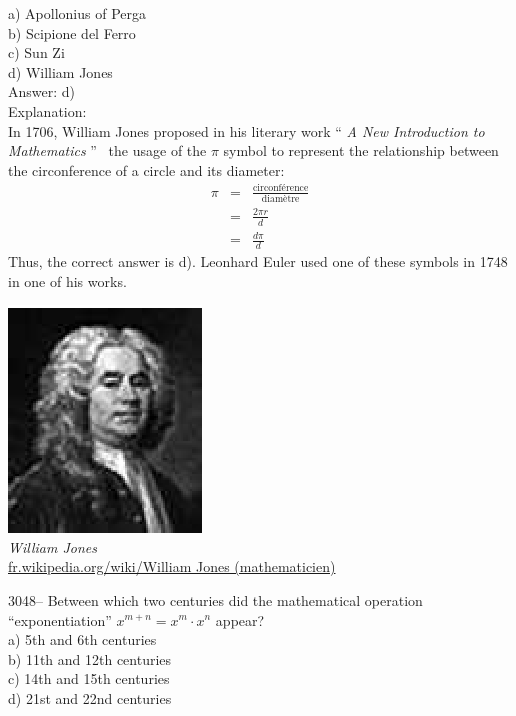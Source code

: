 \documentclass[letterpaper, 12pt]{article}
\begin{document}
a) Apollonius of Perga\\
b) Scipione del Ferro\\
c) Sun Zi\\
d) William Jones\\

Answer: d)\\

Explanation:\\
In 1706, William Jones proposed in his literary work `` \emph{A New Introduction to Mathematics} '' \ the usage of the $\pi$ symbol to represent the relationship between the circonference of a circle and its diameter:
\begin{eqnarray*}
\pi &=& \frac{\textrm{circonf\'erence}}{\textrm{diam\`etre}}\\[2mm]
 &=& \frac{2\pi r}{d}\\[2mm]
 &=& \frac{d\pi}{d}
\end{eqnarray*}
Thus, the correct answer is d). Leonhard Euler used one of these symbols in 1748 in one of his works.

\begin{center}
\includegraphics[scale=1]{William_Jones.eps}\\
\emph{{\small William Jones}}\\
\href{http://fr.wikipedia.org/wiki/William Jones \%28math\%C3\%A9maticien\%29}{fr.wikipedia.org/wiki/William Jones (mathematicien)}\\[5mm]
\end{center}



3048-- Between which two centuries did the mathematical operation ``exponentiation''  $x^{m+n} = x^{m} \cdot x^{n}$ appear?\\

a) 5th and 6th centuries\\
b) 11th and 12th centuries\\
c) 14th and 15th centuries\\
d) 21st and 22nd centuries\\
\end{document}
